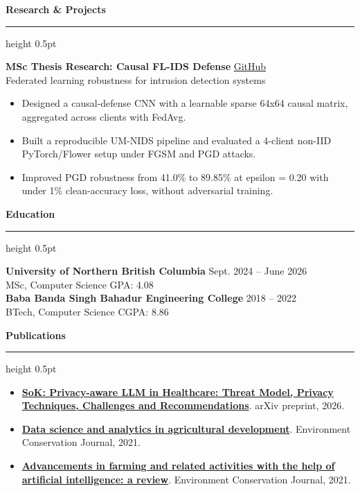 \documentclass[10pt,letterpaper]{article}
\newcommand{\sectiontitle}[1]{%
  \vspace{6pt}
  {\large\bfseries\color{accent}#1}
  \vspace{2pt}
  \hrule height 0.5pt
  \vspace{4pt}
}
\newcommand{\projectentry}[3]{%
  \textbf{#1} \hfill {\small #2}\\
  {\small #3}
}
\begin{document}
\sectiontitle{Research \& Projects}
\projectentry{MSc Thesis Research: Causal FL-IDS Defense}{\href{https://github.com/KaramveerSidhu/causal-fl-ids-defense}{GitHub}}{Federated learning robustness for intrusion detection systems}
\begin{itemize}
  \item Designed a causal-defense CNN with a learnable sparse 64x64 causal matrix, aggregated across clients with FedAvg.
  \item Built a reproducible UM-NIDS pipeline and evaluated a 4-client non-IID PyTorch/Flower setup under FGSM and PGD attacks.
  \item Improved PGD robustness from 41.0\% to 89.85\% at epsilon = 0.20 with under 1\% clean-accuracy loss, without adversarial training.
\end{itemize}

\sectiontitle{Education}
\textbf{University of Northern British Columbia} \hfill {\small Sept. 2024 -- June 2026}\\
MSc, Computer Science \hfill {\small GPA: 4.08}\\[2pt]
\textbf{Baba Banda Singh Bahadur Engineering College} \hfill {\small 2018 -- 2022}\\
BTech, Computer Science \hfill {\small CGPA: 8.86}

\sectiontitle{Publications}
\begin{itemize}
  \item \textbf{\href{https://arxiv.org/abs/2601.10004}{SoK: Privacy-aware LLM in Healthcare: Threat Model, Privacy Techniques, Challenges and Recommendations}}. arXiv preprint, 2026.
  \item \textbf{\href{https://doi.org/10.36953/ECJ.2021.SE.2202}{Data science and analytics in agricultural development}}. Environment Conservation Journal, 2021.
  \item \textbf{\href{https://doi.org/10.36953/ECJ.2021.SE.2206}{Advancements in farming and related activities with the help of artificial intelligence: a review}}. Environment Conservation Journal, 2021.
\end{itemize}
\end{document}
